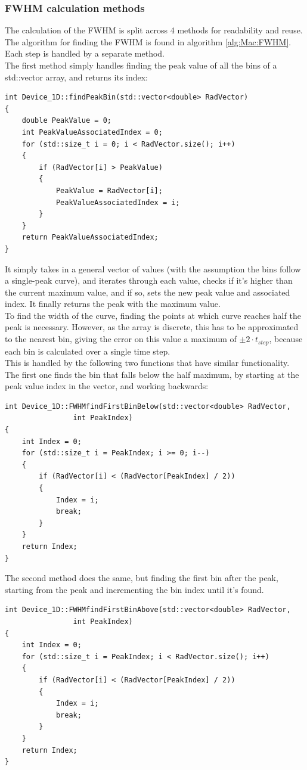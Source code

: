\documentclass[titlepage]{article}
\begin{document}
\subsubsection{FWHM calculation methods}
The calculation of the FWHM is split across 4 methods for readability and reuse. The algorithm for finding the FWHM is found in algorithm \ref{alg:Mac:FWHM}. Each step is handled by a separate method. \\ 
The first method simply handles finding the peak value of all the bins of a std::vector array, and returns its index:
\begin{lstlisting}[caption = Method for finding histogram peak bin]
int Device_1D::findPeakBin(std::vector<double> RadVector)
{
	double PeakValue = 0;
	int PeakValueAssociatedIndex = 0;
	for (std::size_t i = 0; i < RadVector.size(); i++)
	{
		if (RadVector[i] > PeakValue)
		{
			PeakValue = RadVector[i];
			PeakValueAssociatedIndex = i;
		}
	}
	return PeakValueAssociatedIndex;
}
\end{lstlisting}
It simply takes in a general vector of values (with the assumption the bins follow a single-peak curve), and iterates through each value, checks if it's higher than the current maximum value, and if so, sets the new peak value and associated index. It finally returns the peak with the maximum value.\\
To find the width of the curve, finding the points at which curve reaches half the peak is necessary. However, as the array is discrete, this has to be approximated to the nearest bin, giving the error on this value a maximum of $\pm 2\cdot t_{step}$, because each bin is calculated over a single time step.\\
 This is handled by the following two functions that have similar functionality. The first one finds the bin that falls below the half maximum, by starting at the peak value index in the vector, and working backwards:
\begin{lstlisting}[caption = Method for finding first bin to fall below half peak before peak]
int Device_1D::FWHMfindFirstBinBelow(std::vector<double> RadVector, 
				int PeakIndex)
{
	int Index = 0;
	for (std::size_t i = PeakIndex; i >= 0; i--)
	{
		if (RadVector[i] < (RadVector[PeakIndex] / 2))
		{
			Index = i;
			break;
		}
	}
	return Index;
}
\end{lstlisting}
The second method does the same, but finding the first bin after the peak, starting from the peak and incrementing the bin index until it's found.
\begin{lstlisting}[caption = Method for finding first bin to fall below half peak after peak]
int Device_1D::FWHMfindFirstBinAbove(std::vector<double> RadVector, 
				int PeakIndex)
{
	int Index = 0;
	for (std::size_t i = PeakIndex; i < RadVector.size(); i++)
	{
		if (RadVector[i] < (RadVector[PeakIndex] / 2))
		{
			Index = i;
			break;
		}
	}
	return Index;
}
\end{lstlisting}
\end{document}
